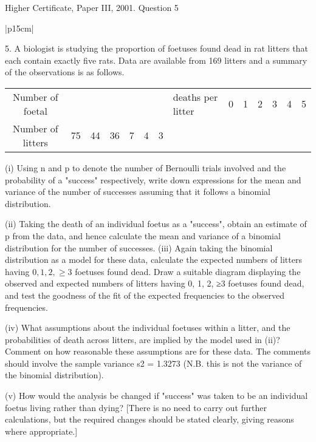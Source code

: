 \documentclass[a4paper,12pt]{article}
\begin{document}
Higher Certificate, Paper III, 2001. Question 5

\begin{table}[ht!]
     


\centering
     


\begin{tabular}{|p{15cm}|}
     


\hline 

5. A biologist is studying the proportion of foetuses found dead in rat litters that each contain exactly five rats.  
Data are available from 169 litters and a summary of the observations is as follows. 

\begin{center} 
\begin{tabular}{|ccccccc|}
Number of foetal & &&&&&&
deaths per litter&  0 & 1 & 2 & 3 & 4 & 5\\ 
Number of litters&  75&  44 & 36&  7&  4&  3 \\
\end{tabular}
\end{center} 
 
(i) Using n and p to denote the number of Bernoulli trials involved and the probability of a "success" respectively, write down expressions 
for the mean and variance of the number of successes assuming that it follows a binomial distribution.  
 
(ii) Taking the death of an individual foetus as a "success", obtain an estimate of p from the data, and hence calculate the mean 
and variance of a binomial distribution for the number of successes.  
(iii) Again taking the binomial distribution as a model for these data, calculate the expected numbers of litters having $0, 1, 2, \geq 3 $ foetuses found dead. 
 Draw a suitable diagram displaying the observed and expected numbers of litters having 0, 1, 2, ≥3 foetuses found dead, and test 
the goodness of the fit of the expected frequencies to the observed frequencies.  
 
(iv) What assumptions about the individual foetuses within a litter, and the probabilities of death across litters, are implied by
 the model used in (ii)?  Comment on how reasonable these assumptions are for these data.  The comments should involve the 
sample variance s2 = 1.3273 (N.B. this is not the variance of the binomial distribution).  
 
(v) How would the analysis be changed if "success" was taken to be an individual foetus living rather than dying? 
 [There is no need to carry out further calculations, but the required changes should be stated clearly, giving reasons where appropriate.]  
 
 
\\ \hline



\end{tabular}
    


\end{table}
\end{document}

